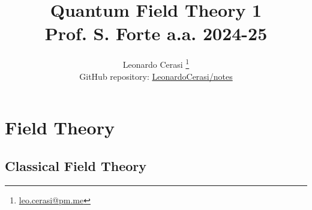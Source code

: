 \documentclass[a4paper, 12pt, openany]{book}
\title{\Huge\textbf{Quantum Field Theory 1} \\ \large Prof. S. Forte a.a. 2024-25}
\author{Leonardo Cerasi%
	\thanks{\scriptsize\href{mailto:leonardo.cerasi@studenti.unimi.it}{leo.cerasi@pm.me}}\\
	\small GitHub repository: \href{https://github.com/LeonardoCerasi/notes}{LeonardoCerasi/notes}}
\begin{document}
\frontmatter

\maketitle
\tableofcontents
\pagestyle{indice}

\mainmatter

\part{Field Theory}
\pagestyle{body}

\chapter{Classical Field Theory}

\end{document}
